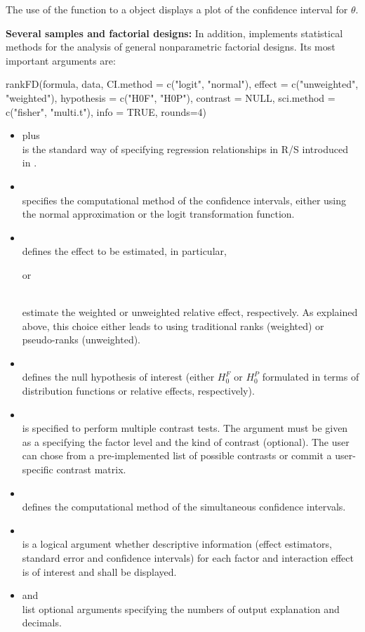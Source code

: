The use of the  function to a  object displays 
a plot of the confidence interval for $\theta$.

\textbf{Several samples and factorial designs:} In addition,  implements statistical 
methods for the analysis of general nonparametric factorial designs.  Its most 
important arguments are:
\begin{example}
rankFD(formula, data, CI.method = c("logit", "normal"), 
	effect = c("unweighted", "weighted"), hypothesis = c("H0F", "H0P"),
	contrast = NULL, sci.method = c("fisher", "multi.t"),
	info = TRUE, rounds=4)
\end{example}
\begin{itemize}
\item {} plus  \\
is the standard way of specifying regression relationships in 
R/S introduced in \cite{Chambers+Hastie:1992}.
\item {} \\
specifies the computational method of the confidence intervals, either using 
the normal approximation or the logit transformation function.
\item {} \\
defines the effect to be estimated, in particular, \\
\centerline{ or } \\
estimate the weighted or unweighted relative effect, respectively. As explained 
above, this choice either leads to using traditional ranks (weighted) or 
pseudo-ranks (unweighted).
\item {} \\ 
defines the null hypothesis of interest (either $H_0^F$ or $H_0^P$ formulated in terms of distribution functions or relative effects, respectively).
\item {} \\ 
is specified to perform multiple contrast tests. The argument must be given as 
a  specifying the factor level and the kind of contrast (optional). 
The user can chose from a pre-implemented list of possible contrasts or commit 
a user-specific contrast matrix. 
\item {} \\
defines the computational method of the simultaneous confidence intervals. 
\item {} \\
is a logical argument whether descriptive information (effect estimators, 
standard error and confidence intervals) for each factor and interaction effect 
is of interest and shall be displayed.
\item {} and  \\
list optional arguments specifying the numbers of output explanation and 
decimals. 
\end{itemize}

